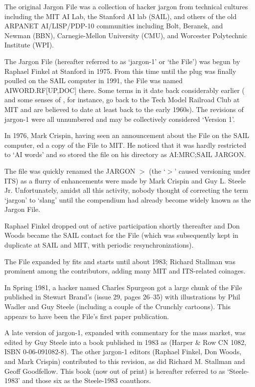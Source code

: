 The original Jargon File was a collection of hacker jargon from technical
cultures including the MIT AI Lab, the Stanford AI lab (SAIL), and others of
the old ARPANET AI/LISP/PDP-10 communities including Bolt, Beranek, and Newman
(BBN), Carnegie-Mellon University (CMU), and Worcester Polytechnic Institute
(WPI).

The Jargon File (hereafter referred to as `jargon-1' or `the File') was begun
by Raphael Finkel at Stanford in 1975. From this time until the plug was
finally poulled on the SAIL computer in 1991, the File was named
AIWORD.RF[UP,DOC] there. Some terms in it date back considerably earlier
( and some senses of , for instance, go back to
the Tech Model Railroad Club at MIT and are believed to date at least back to
the early 1960s). The revisions of jargon-1 were all unnumbered and may be
collectively considered `Version 1'.

In 1976, Mark Crispin, having seen an announcement about the File on the SAIL
computer, ed a copy of the File to MIT. He noticed that it was
hardly restricted to `AI words' and so stored the file on his directory as
AI:MRC;SAIL JARGON.

The file was quickly renamed the JARGON $>$ (the `$>$' caused versioning under
ITS) as a flurry of enhancements were made by Mark Crispin and Guy L. Steele
Jr. Unfortunately, amidst all this activity, nobody thought of correcting the
term `jargon' to `slang' until the compendium had already become widely known
as the Jargon File.

Raphael Finkel dropped out of active participation shortly thereafter and Don
Woods became the SAIL contact for the File (which was subsequently kept in
duplicate at SAIL and MIT, with periodic resynchronizations).

The File expanded by fits and starts until about 1983; Richard Stallman was
prominent among the contributors, adding many MIT and ITS-related coinages.

In Spring 1981, a hacker named Charles Spurgeon got a large chunk of the File
published in Stewart Brand's  (issue 29, pages
26--35) with illustrations by Phil Wadler and Guy Steele (including a couple of
the Crunchly cartoons). This appears to have been the File's first paper
publication.

A late version of jargon-1, expanded with commentary for the mass market, was
edited by Guy Steele into a book published in 1983 as  (Harper \& Row CN 1082, ISBN 0-06-091082-8). The other jargon-1
editors (Raphael Finkel, Don Woods, and Mark Crispin) contributed to this
revision, as did Richard M. Stallman and Geoff Goodfellow. This book (now out
of print) is hereafter referred to as `Steele-1983' and those six as the
Steele-1983 coauthors.

